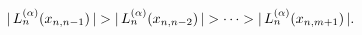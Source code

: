 $|\mathop{L^{(\alpha)}_{n}\/}\nolimits\!\left(x_{n,n-1}\right)|>|\mathop{L^{(%
\alpha)}_{n}\/}\nolimits\!\left(x_{n,n-2}\right)|>\cdots>|\mathop{L^{(\alpha)}%
_{n}\/}\nolimits\!\left(x_{n,m+1}\right)|.$